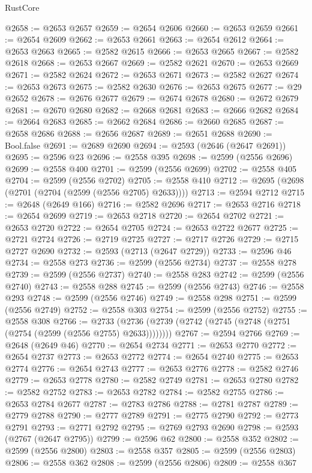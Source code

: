 \begin{lexlean}{RustCore}
\begin{coremodule}
@2658 := @2653 @2657
@2659 := @2654 @2606
@2660 := @2653 @2659
@2661 := @2654 @2609
@2662 := @2653 @2661
@2663 := @2654 @2612
@2664 := @2653 @2663
@2665 := @2582 @2615
@2666 := @2653 @2665
@2667 := @2582 @2618
@2668 := @2653 @2667
@2669 := @2582 @2621
@2670 := @2653 @2669
@2671 := @2582 @2624
@2672 := @2653 @2671
@2673 := @2582 @2627
@2674 := @2653 @2673
@2675 := @2582 @2630
@2676 := @2653 @2675
@2677 := @29 @2652
@2678 := @2676 @2677
@2679 := @2674 @2678
@2680 := @2672 @2679
@2681 := @2670 @2680
@2682 := @2668 @2681
@2683 := @2666 @2682
@2684 := @2664 @2683
@2685 := @2662 @2684
@2686 := @2660 @2685
@2687 := @2658 @2686
@2688 := @2656 @2687
@2689 := @2651 @2688
@2690 := Bool.false
@2691 := @2689 @2690
@2694 := @2593 (@2646 (@2647 @2691))
@2695 := @2596 @23
@2696 := @2558 @395
@2698 := @2599 (@2556 @2696)
@2699 := @2558 @400
@2701 := @2599 (@2556 @2699)
@2702 := @2558 @405
@2704 := @2599 (@2556 @2702)
@2705 := @2558 @410
@2712 := @2695 (@2698 (@2701 (@2704 (@2599 (@2556 @2705) @2633))))
@2713 := @2594 @2712
@2715 := @2648 (@2649 @166)
@2716 := @2582 @2696
@2717 := @2653 @2716
@2718 := @2654 @2699
@2719 := @2653 @2718
@2720 := @2654 @2702
@2721 := @2653 @2720
@2722 := @2654 @2705
@2724 := @2653 @2722 @2677
@2725 := @2721 @2724
@2726 := @2719 @2725
@2727 := @2717 @2726
@2729 := @2715 @2727 @2690
@2732 := @2593 (@2713 (@2647 @2729))
@2733 := @2596 @46
@2734 := @2558 @273
@2736 := @2599 (@2556 @2734)
@2737 := @2558 @278
@2739 := @2599 (@2556 @2737)
@2740 := @2558 @283
@2742 := @2599 (@2556 @2740)
@2743 := @2558 @288
@2745 := @2599 (@2556 @2743)
@2746 := @2558 @293
@2748 := @2599 (@2556 @2746)
@2749 := @2558 @298
@2751 := @2599 (@2556 @2749)
@2752 := @2558 @303
@2754 := @2599 (@2556 @2752)
@2755 := @2558 @308
@2766 := @2733 (@2736 (@2739 (@2742 (@2745 (@2748 (@2751 (@2754 (@2599 (@2556 @2755) @2633))))))))
@2767 := @2594 @2766
@2769 := @2648 (@2649 @46)
@2770 := @2654 @2734
@2771 := @2653 @2770
@2772 := @2654 @2737
@2773 := @2653 @2772
@2774 := @2654 @2740
@2775 := @2653 @2774
@2776 := @2654 @2743
@2777 := @2653 @2776
@2778 := @2582 @2746
@2779 := @2653 @2778
@2780 := @2582 @2749
@2781 := @2653 @2780
@2782 := @2582 @2752
@2783 := @2653 @2782
@2784 := @2582 @2755
@2786 := @2653 @2784 @2677
@2787 := @2783 @2786
@2788 := @2781 @2787
@2789 := @2779 @2788
@2790 := @2777 @2789
@2791 := @2775 @2790
@2792 := @2773 @2791
@2793 := @2771 @2792
@2795 := @2769 @2793 @2690
@2798 := @2593 (@2767 (@2647 @2795))
@2799 := @2596 @62
@2800 := @2558 @352
@2802 := @2599 (@2556 @2800)
@2803 := @2558 @357
@2805 := @2599 (@2556 @2803)
@2806 := @2558 @362
@2808 := @2599 (@2556 @2806)
@2809 := @2558 @367

\end{coremodule}
\end{lexlean}

